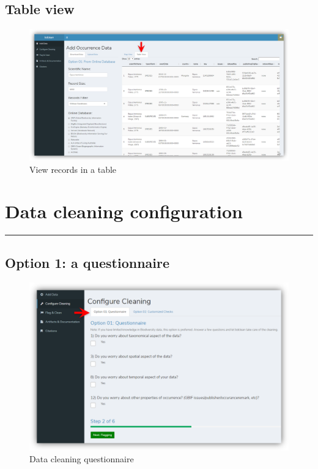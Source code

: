 \documentclass[]{book}
\begin{document}
\section{Table view}\label{table-view}

\begin{figure}
\centering
\includegraphics{img/bdclean_add_data_table.png}
\caption{View records in a table}
\end{figure}

\chapter{Data cleaning configuration}\label{data-cleaning-configuration}

\begin{center}\rule{0.5\linewidth}{\linethickness}\end{center}

\section{Option 1: a questionnaire}\label{option-1-a-questionnaire}

\begin{figure}
\centering
\includegraphics{img/bdclean_questionnaire-empty.png}
\caption{Data cleaning questionnaire}
\end{figure}
\end{document}
